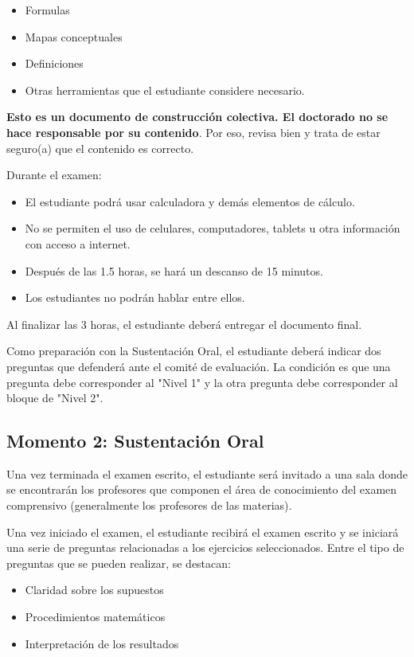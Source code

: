 \begin{itemize}
    \item Formulas
    \item Mapas conceptuales
    \item Definiciones
    \item Otras herramientas que el estudiante considere necesario.
\end{itemize}

\textbf{Esto es un documento de construcción colectiva. El doctorado no se hace responsable por su contenido}. Por eso, revisa bien y trata de estar seguro(a) que el contenido es correcto.

Durante el examen: 
\begin{itemize}
    \item El estudiante podrá usar calculadora y demás elementos de cálculo.
    \item No se permiten el uso de celulares, computadores, tablets u otra información con acceso a internet.
    \item Después de las 1.5 horas, se hará un descanso de 15 minutos.
    \item Los estudiantes no podrán hablar entre ellos.
\end{itemize}

Al finalizar las 3 horas, el estudiante deberá entregar el documento final.

Como preparación con la Sustentación Oral, el estudiante deberá indicar dos preguntas que defenderá ante el comité de evaluación. La condición es que una pregunta debe corresponder al "Nivel 1" y la otra pregunta debe corresponder al bloque de "Nivel 2". 

\subsection{Momento 2: Sustentación Oral}

Una vez terminada el examen escrito, el estudiante será invitado a una sala donde se encontrarán los profesores que componen el área de conocimiento del examen comprensivo (generalmente los profesores de las materias).

Una vez iniciado el examen, el estudiante recibirá el examen escrito y se iniciará una serie de preguntas relacionadas a los ejercicios seleccionados. Entre el tipo de preguntas que se pueden realizar, se destacan:

\begin{itemize}
 \item Claridad sobre los supuestos
 \item Procedimientos matemáticos
 \item Interpretación de los resultados
\end{itemize}


